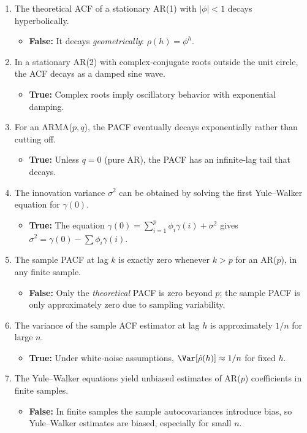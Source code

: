\documentclass{article}
\begin{document}
\begin{enumerate}
  \item The theoretical ACF of a stationary AR(1) with $|\phi|<1$ decays hyperbolically.
  \begin{itemize}
    \item \textbf{False:}  It decays \emph{geometrically}: $\rho(h)=\phi^h$.
  \end{itemize}

  \item In a stationary AR(2) with complex‐conjugate roots outside the unit circle, the ACF decays as a damped sine wave.
  \begin{itemize}
    \item \textbf{True:}  Complex roots imply oscillatory behavior with exponential damping.
  \end{itemize}

  \item For an ARMA($p,q$), the PACF eventually decays exponentially rather than cutting off.
  \begin{itemize}
    \item \textbf{True:}  Unless $q=0$ (pure AR), the PACF has an infinite‐lag tail that decays.
  \end{itemize}

  \item The innovation variance $\sigma^2$ can be obtained by solving the first Yule–Walker equation for $\gamma(0)$.
  \begin{itemize}
    \item \textbf{True:}  The equation $\gamma(0)=\sum_{i=1}^p\phi_i\gamma(i)+\sigma^2$ gives $\sigma^2=\gamma(0)-\sum\phi_i\gamma(i)$.
  \end{itemize}

  \item The sample PACF at lag $k$ is exactly zero whenever $k>p$ for an AR($p$), in any finite sample.
  \begin{itemize}
    \item \textbf{False:}  Only the \emph{theoretical} PACF is zero beyond $p$; the sample PACF is only approximately zero due to sampling variability.
  \end{itemize}

  \item The variance of the sample ACF estimator at lag $h$ is approximately $1/n$ for large $n$.
  \begin{itemize}
    \item \textbf{True:}  Under white‐noise assumptions, $\Var[\hat\rho(h)]\approx1/n$ for fixed $h$.
  \end{itemize}
    \item The Yule–Walker equations yield unbiased estimates of AR($p$) coefficients in finite samples.
  \begin{itemize}
    \item \textbf{False:} In finite samples the sample autocovariances introduce bias, so Yule–Walker estimates are biased, especially for small $n$.
  \end{itemize}


\end{enumerate}
\end{document}
